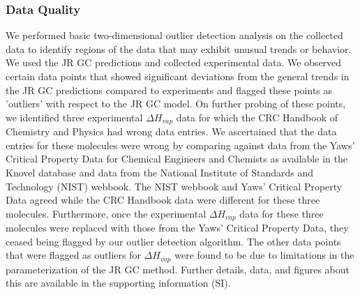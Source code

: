 \documentclass[journal=jacsat,manuscript=article]{achemso}
\begin{document}
\subsubsection{Data Quality}
We performed basic two-dimensional outlier detection analysis on the collected data to identify regions of the data that may exhibit unusual trends or behavior. We used the JR GC predictions and collected experimental data. We observed certain data points that showed significant deviations from the general trends in the JR GC predictions compared to experiments and flagged these points as 'outliers' with respect to the JR GC model. On further probing of these points, we identified three experimental $\Delta H_{vap}$ data for which the CRC Handbook of Chemistry and Physics had wrong data entries. We ascertained that the data entries for these molecules were wrong by comparing against data from the Yaws' Critical Property Data for Chemical Engineers and Chemists as available in the Knovel database and data from the National Institute of Standards and Technology (NIST) \cite{informaticsNISTChemistryWebBook} webbook. The NIST webbook and Yaws' Critical Property Data agreed while the CRC Handbook data were different for these three molecules. Furthermore, once the experimental $\Delta H_{vap}$ data for these three molecules were replaced with those from the Yaws' Critical Property Data, they ceased being flagged by our outlier detection algorithm. The other data points that were flagged as outliers for $\Delta H_{vap}$ were found to be due to limitations in the parameterization of the JR GC method. Further details, data, and figures about this are available in the supporting information (SI). 
\end{document}
